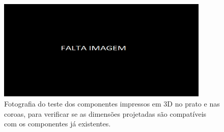 \begin{figure}[htb]
    \centering
    \includegraphics[width = 0.9\textwidth]{Figures/Cap3/Falta_imagem_larga.png}
    \caption[Teste dos componentes impressos em 3D no prato e nas coroas]%
    {Fotografia do teste dos componentes impressos em 3D no prato e nas coroas, para verificar se as dimensões projetadas são compatíveis com os componentes já existentes.}
    \label{fig:esquema_ensaio_simples}
\end{figure}
